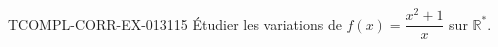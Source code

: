 \begin{exercice}{TCOMPL-CORR-EX-013}{1}{15}
Étudier les variations de $f(x) = \dfrac{x^2+1}{x}$ sur $\mathbb{R}^*$.

\end{exercice}
